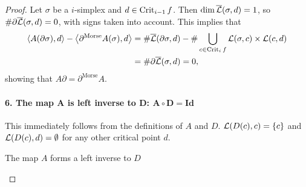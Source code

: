 \begin{proof}
    Let $\sigma$ be a  $i$-simplex and $d \in \operatorname{Crit}_{i-1} f$.
    Then $\dim \overline{\mathcal L}(\sigma, d) = 1$, so  $\# \partial \overline{\mathcal L}(\sigma, d) = 0$, with signs taken into account.
    This implies that
    \begin{align*}
        \left<A(\partial \sigma), d \right> - \left<\partial^{\text{Morse}} A (\sigma) ,d\right> &= \# \overline{\mathcal L}(\partial \sigma, d) - \# \bigcup_{c \in  \operatorname{Crit}_i f} \mathcal L(\sigma, c) \times  \mathcal L(c, d)\\
                                                                                                 &= \# \partial \overline{\mathcal L}(\sigma, d) = 0
    ,\end{align*} 
    showing that $A \partial = \partial^{\text{Morse}} A$.


\paragraph{6. The map $\bm{A}$ is left inverse to $\bm{D}$: $\bm{A  \circ D = \text{Id}}$}
    This immediately follows from the definitions of $A$ and $D$.
    $\mathcal L(D(c), c) = \{c\}$ and $\mathcal L(D(c), d) = \emptyset$ for any other critical point $d$.
\begin{marginfigure}
    \centering
    \caption{The map $A$ forms a left inverse to $D$}
    \label{fig:a-is-left-inverse-to-d}
\end{marginfigure}



\end{proof}
